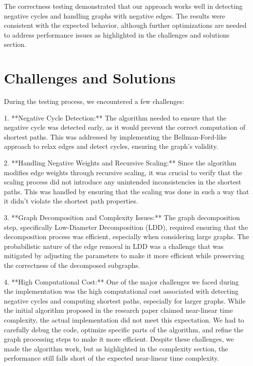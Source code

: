 \documentclass{article}
\begin{document}
The correctness testing demonstrated that our approach works well in detecting negative cycles and handling graphs with negative edges. The results were consistent with the expected behavior, although further optimizations are needed to address performance issues as highlighted in the challenges and solutions section.


\section{Challenges and Solutions}
\label{sec:Challenges_and_Solutions}

During the testing process, we encountered a few challenges:

1. **Negative Cycle Detection:** The algorithm needed to ensure that the negative cycle was detected early, as it would prevent the correct computation of shortest paths. This was addressed by implementing the Bellman-Ford-like approach to relax edges and detect cycles, ensuring the graph's validity.

2. **Handling Negative Weights and Recursive Scaling:** Since the algorithm modifies edge weights through recursive scaling, it was crucial to verify that the scaling process did not introduce any unintended inconsistencies in the shortest paths. This was handled by ensuring that the scaling was done in such a way that it didn't violate the shortest path properties.

3. **Graph Decomposition and Complexity Issues:** The graph decomposition step, specifically Low-Diameter Decomposition (LDD), required ensuring that the decomposition process was efficient, especially when considering large graphs. The probabilistic nature of the edge removal in LDD was a challenge that was mitigated by adjusting the parameters to make it more efficient while preserving the correctness of the decomposed subgraphs.

4. **High Computational Cost:** One of the major challenges we faced during the implementation was the high computational cost associated with detecting negative cycles and computing shortest paths, especially for larger graphs. While the initial algorithm proposed in the research paper claimed near-linear time complexity, the actual implementation did not meet this expectation. We had to carefully debug the code, optimize specific parts of the algorithm, and refine the graph processing steps to make it more efficient. Despite these challenges, we made the algorithm work, but as highlighted in the complexity section, the performance still falls short of the expected near-linear time complexity.
\end{document}
